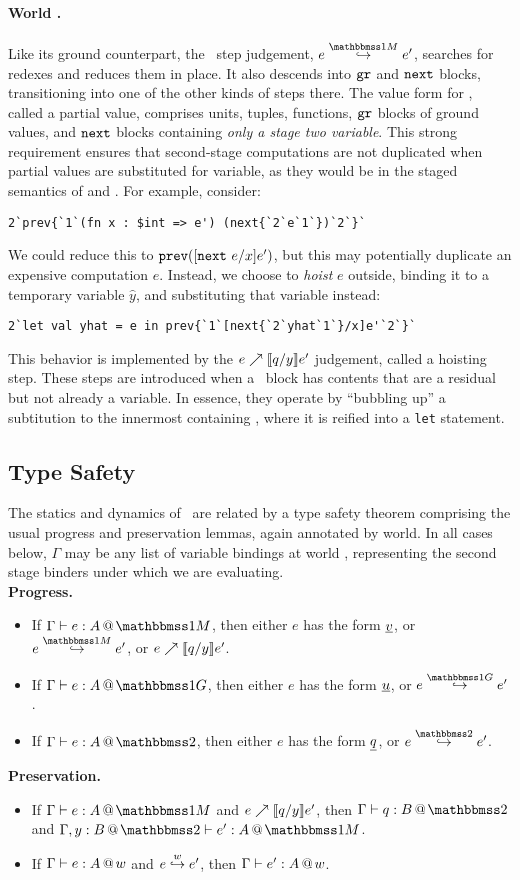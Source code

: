 \paragraph{World \bbonem.}
Like its ground counterpart, the \bbonem\ step judgement, $\stepmix e {e'}$, searches for redexes and reduces them in place.
It also descends into ${\tt gr}$ and ${\tt next}$ blocks, transitioning into one of the other kinds of steps there. 
The value form for \bbonem, called a partial value, comprises units, tuples, functions, ${\tt gr}$ blocks of ground values, and ${\tt next}$ blocks containing \emph{only a stage two variable}.
This strong requirement ensures that second-stage computations are not duplicated when partial values are substituted for variable,
as they would be in the staged semantics of \cite{taha-thesis-99} and \cite{davies96}.
For example, consider:
\begin{lstlisting} 
2`prev{`1`(fn x : $int => e') (next{`2`e`1`})`2`}`
\end{lstlisting}
We could reduce this to ${\tt prev}([{\tt next}~e/x]e')$, but this may potentially duplicate an
expensive computation $e$. Instead, we choose to \emph{hoist} $e$ outside, binding it
to a temporary variable $\hat{y}$, and substituting that variable instead:
\begin{lstlisting} 
2`let val yhat = e in prev{`1`[next{`2`yhat`1`}/x]e'`2`}`
\end{lstlisting}
This behavior is implemented by the ${e}\nearrow \llbracket q/y \rrbracket{e'}$ judgement, called a hoisting step.
These steps are introduced when a \next\ block has contents that are a residual but not already a variable.
In essence, they operate by ``bubbling up'' a subtitution to the innermost containing \prev,
where it is reified into a {\tt let} statement.

\subsection{Type Safety}

The statics and dynamics of \lang\ are related by a type safety theorem
comprising the usual progress and preservation lemmas, again annotated by world.
In all cases below, $\Gamma$ may be any list of variable bindings at world \bbtwo,
representing the second stage binders under which we are evaluating.
\\{\bf Progress.~} 
\begin{itemize}
\item If $\typesone e A$, then either $e$ has the form $\underline{v}$, or $\stepmix e {e'}$, or ${e}\nearrow \llbracket q/y \rrbracket{e'}$.
\item If $\typespure e A$, then either $e$ has the form $\underline{u}$, or $\steppure e {e'}$.
\item If $\typestwo e A$, then either $e$ has the form $\underline{q}$, or $\steptwo e {e'}$.
\end{itemize}
{\bf Preservation.~} 
\begin{itemize}
\item If $\typesone e A$ and ${e}\nearrow \llbracket q/y \rrbracket{e'}$, then $\typestwo q B$ and $\typesone [\Gamma,\coltwo y B] {e'} A$.
\item If $\Gamma{} \vdash {e}:{A}~\hspace{-0.15em}\text{@}\hspace{-0.2em}~w$ and ${e}\overset{w}\hookrightarrow {e'}$, then $\Gamma{} \vdash {e'}:{A}~\hspace{-0.15em}\text{@}\hspace{-0.2em}~w$.
\end{itemize}

